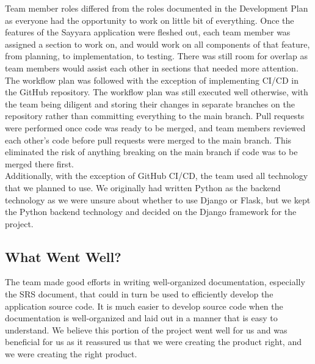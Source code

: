 \documentclass{article}
\begin{document}
\noindent Team member roles differed from the roles documented in the Development Plan as everyone had the opportunity to work on little bit of everything.
Once the features of the Sayyara application were fleshed out, each team member was assigned a section to work on, and would work on all components of that
feature, from planning, to implementation, to testing. There was still room for overlap as team members would assist each other in sections that needed more
attention.\\

\noindent The workflow plan was followed with the exception of implementing CI/CD in the GitHub repository. The workflow plan was still executed well
otherwise, with the team being diligent and storing their changes in separate branches on the repository rather than committing everything to the main
branch. Pull requests were performed once code was ready to be merged, and team members reviewed each other's code before pull requests were merged to the
main branch. This eliminated the risk of anything breaking on the main branch if code was to be merged there first.\\

\noindent Additionally, with the exception of GitHub CI/CD, the team used all technology that we planned to use. We originally had written Python as the
backend technology as we were unsure about whether to use Django or Flask, but we kept the Python backend technology and decided on the Django framework for
the project.

\subsection{What Went Well?}

\noindent The team made good efforts in writing well-organized documentation, especially the SRS document, that could in turn be used to efficiently develop
the application source code. It is much easier to develop source code when the documentation is well-organized and laid out in a manner that is easy to
understand. We believe this portion of the project went well for us and was beneficial for us as it reassured us that we were creating the product right,
and we were creating the right product.\\
\end{document}
